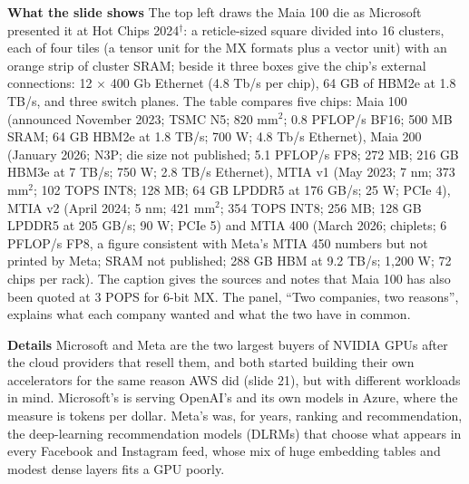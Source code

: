 \documentclass[11pt,letterpaper]{article}
\newcommand{\para}[1]{\medskip\noindent\textbf{#1}\quad}
\begin{document}
\para{What the slide shows} The top left draws the Maia 100 die as Microsoft presented it at Hot Chips 2024$^\dagger$: a reticle-sized square divided into 16 clusters, each of four tiles (a tensor unit for the MX formats plus a vector unit) with an orange strip of cluster SRAM; beside it three boxes give the chip's external connections: 12 $\times$ 400 Gb Ethernet (4.8 Tb/s per chip), 64 GB of HBM2e at 1.8 TB/s, and three switch planes. The table compares five chips: Maia 100 (announced November 2023; TSMC N5; 820 mm$^2$; 0.8 PFLOP/s BF16; 500 MB SRAM; 64 GB HBM2e at 1.8 TB/s; 700 W; 4.8 Tb/s Ethernet), Maia 200 (January 2026; N3P; die size not published; 5.1 PFLOP/s FP8; 272 MB; 216 GB HBM3e at 7 TB/s; 750 W; 2.8 TB/s Ethernet), MTIA v1 (May 2023; 7 nm; 373 mm$^2$; 102 TOPS INT8; 128 MB; 64 GB LPDDR5 at 176 GB/s; 25 W; PCIe 4), MTIA v2 (April 2024; 5 nm; 421 mm$^2$; 354 TOPS INT8; 256 MB; 128 GB LPDDR5 at 205 GB/s; 90 W; PCIe 5) and MTIA 400 (March 2026; chiplets; 6 PFLOP/s FP8, a figure consistent with Meta's MTIA 450 numbers but not printed by Meta; SRAM not published; 288 GB HBM at 9.2 TB/s; 1{,}200 W; 72 chips per rack). The caption gives the sources and notes that Maia 100 has also been quoted at 3 POPS for 6-bit MX. The panel, ``Two companies, two reasons'', explains what each company wanted and what the two have in common.

\para{Details} Microsoft and Meta are the two largest buyers of NVIDIA GPUs after the cloud providers that resell them, and both started building their own accelerators for the same reason AWS did (slide 21), but with different workloads in mind. Microsoft's is serving OpenAI's and its own models in Azure, where the measure is tokens per dollar. Meta's was, for years, ranking and recommendation, the deep-learning recommendation models (DLRMs) that choose what appears in every Facebook and Instagram feed, whose mix of huge embedding tables and modest dense layers fits a GPU poorly.
\end{document}
